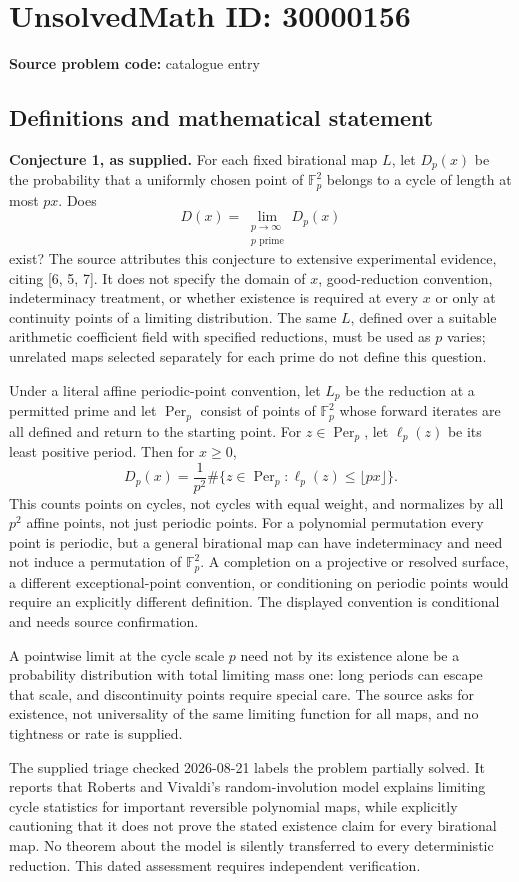 \documentclass[11pt]{article}
\newcommand{\F}{\mathbb{F}}
\begin{document}
\section*{UnsolvedMath ID: 30000156}
\textbf{Source problem code:} catalogue entry
\subsection{Definitions and mathematical statement}
\textbf{Conjecture 1, as supplied.} For each fixed birational map \(L\), let \(D_p(x)\) be the probability that a uniformly chosen point of \(\F_p^2\) belongs to a cycle of length at most \(px\). Does\[D(x)=\lim_{\substack{p\to\infty\\p\text{ prime}}}D_p(x)\] exist? The source attributes this conjecture to extensive experimental evidence, citing [6, 5, 7]. It does not specify the domain of \(x\), good-reduction convention, indeterminacy treatment, or whether existence is required at every \(x\) or only at continuity points of a limiting distribution. The same \(L\), defined over a suitable arithmetic coefficient field with specified reductions, must be used as \(p\) varies; unrelated maps selected separately for each prime do not define this question.\par Under a literal affine periodic-point convention, let \(L_p\) be the reduction at a permitted prime and let \(\operatorname{Per}_p\) consist of points of \(\F_p^2\) whose forward iterates are all defined and return to the starting point. For \(z\in\operatorname{Per}_p\), let \(\ell_p(z)\) be its least positive period. Then for \(x\ge0\),\[D_p(x)=\frac1{p^2}\#\{z\in\operatorname{Per}_p:\ell_p(z)\le\lfloor px\rfloor\}.\] This counts points on cycles, not cycles with equal weight, and normalizes by all \(p^2\) affine points, not just periodic points. For a polynomial permutation every point is periodic, but a general birational map can have indeterminacy and need not induce a permutation of \(\F_p^2\). A completion on a projective or resolved surface, a different exceptional-point convention, or conditioning on periodic points would require an explicitly different definition. The displayed convention is conditional and needs source confirmation.\par A pointwise limit at the cycle scale \(p\) need not by its existence alone be a probability distribution with total limiting mass one: long periods can escape that scale, and discontinuity points require special care. The source asks for existence, not universality of the same limiting function for all maps, and no tightness or rate is supplied.\par The supplied triage checked 2026-08-21 labels the problem partially solved. It reports that Roberts and Vivaldi's random-involution model explains limiting cycle statistics for important reversible polynomial maps, while explicitly cautioning that it does not prove the stated existence claim for every birational map. No theorem about the model is silently transferred to every deterministic reduction. This dated assessment requires independent verification.
\end{document}
